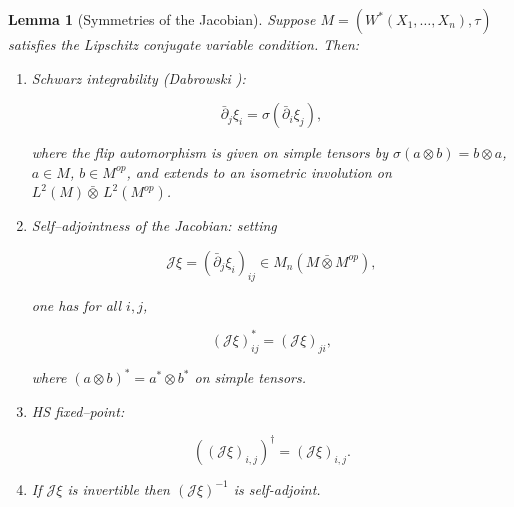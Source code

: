 \documentclass[10pt,a4paper,reqno]{amsart}
\newtheorem{lemma}[theorem]{Lemma}
\begin{document}
\begin{lemma}[Symmetries of the Jacobian]\label{second}
Suppose $M=(W^\ast(X_1,\ldots,X_n),\tau)$ satisfies the \emph{Lipschitz conjugate variable condition}. Then:
\begin{enumerate}
    \item \emph{Schwarz integrability} (Dabrowski \cite[Lemma~36]{Dab14}):
    

\[
      \bar{\partial}_j\xi_i=\sigma(\bar{\partial}_i \xi_j),
    \]


    where the flip automorphism is given on simple tensors by $\sigma(a\otimes b)=b\otimes a$, $a\in M$, $b\in M^{op}$, and extends to an isometric involution on $L^2(M){\bar\otimes}\,L^2(M^{op})$.
    
    \item \emph{Self--adjointness of the Jacobian:} setting
    

\[
      \mathscr{J}\xi=(\bar{\partial}_j\xi_i)_{ij}\in M_n(M\bar{\otimes}M^{op}),
    \]


    one has for all $i,j$,
    

\[
      (\mathscr{J}\xi)_{ij}^\ast=(\mathscr{J}\xi)_{ji},
    \]


    where $(a\otimes b)^\ast=a^\ast\otimes b^\ast$ on simple tensors.
    
    \item \emph{HS fixed--point:}
    

\[
      ((\mathscr{J}\xi)_{i,j})^{\dagger}=(\mathscr{J}\xi)_{i,j}.
    \]


    \item If $\mathscr{J}\xi$ is invertible then $(\mathscr{J}\xi)^{-1}$ is self-adjoint.
\end{enumerate}
\end{lemma}
\end{document}
